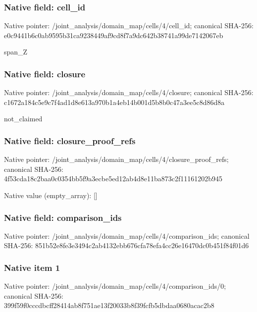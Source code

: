 \documentclass[10pt,a4paper]{article}
\begin{document}
\subsubsection{Native field: cell\_\allowbreak{}id}
Native pointer: /joint\_\allowbreak{}analysis/domain\_\allowbreak{}map/cells/4/cell\_\allowbreak{}id; canonical SHA-256: e0c9441b6c0ab9595b31ca9238449af9cd8f7a9dc642b38741a99de7142067eb

\begingroup\raggedright\sloppy span\_\allowbreak{}Z\par\endgroup

\subsubsection{Native field: closure}
Native pointer: /joint\_\allowbreak{}analysis/domain\_\allowbreak{}map/cells/4/closure; canonical SHA-256: c1672a184c5e9c7f4ad1d8e613a970b1a4eb14b001d5b8b0c47a3ee5c8d86d8a

\begingroup\raggedright\sloppy not\_\allowbreak{}claimed\par\endgroup

\subsubsection{Native field: closure\_\allowbreak{}proof\_\allowbreak{}refs}
Native pointer: /joint\_\allowbreak{}analysis/domain\_\allowbreak{}map/cells/4/closure\_\allowbreak{}proof\_\allowbreak{}refs; canonical SHA-256: 4f53cda18c2baa0c0354bb5f9a3ecbe5ed12ab4d8e11ba873c2f11161202b945

Native value (empty\_\allowbreak{}array): []

\subsubsection{Native field: comparison\_\allowbreak{}ids}
Native pointer: /joint\_\allowbreak{}analysis/domain\_\allowbreak{}map/cells/4/comparison\_\allowbreak{}ids; canonical SHA-256: 851b52e8fe3e3494c2ab4132ebb676cfa78efa4cc26e16470dc0b451f84f01d6

\subsubsection{Native item 1}
Native pointer: /joint\_\allowbreak{}analysis/domain\_\allowbreak{}map/cells/4/comparison\_\allowbreak{}ids/0; canonical SHA-256: 399f59f0cccdbcff28414ab8f751ae13f20033b8f39fcfb5dbdaa0680acac2b8
\end{document}
